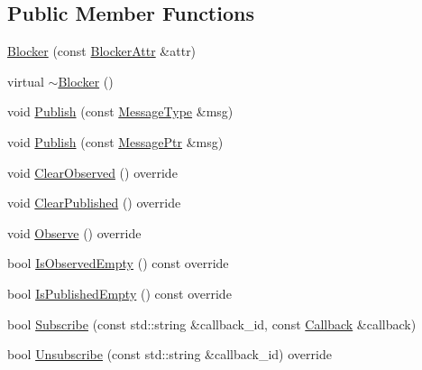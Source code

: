 \subsection*{Public Member Functions}
\begin{DoxyCompactItemize}
\item 
\hyperlink{classapollo_1_1cyber_1_1blocker_1_1Blocker_a088532493a0783825880ed2dbf97f783}{Blocker} (const \hyperlink{structapollo_1_1cyber_1_1blocker_1_1BlockerAttr}{Blocker\-Attr} \&attr)
\item 
virtual \hyperlink{classapollo_1_1cyber_1_1blocker_1_1Blocker_a843112b632a8700b492e91161e3792ea}{$\sim$\-Blocker} ()
\item 
void \hyperlink{classapollo_1_1cyber_1_1blocker_1_1Blocker_a6c07deb7c68f3007f484048cac1ae532}{Publish} (const \hyperlink{classapollo_1_1cyber_1_1blocker_1_1Blocker_ab6f5eb86a03109c66581e377a896650a}{Message\-Type} \&msg)
\item 
void \hyperlink{classapollo_1_1cyber_1_1blocker_1_1Blocker_a511886deab8a981a9f054d3f3622825a}{Publish} (const \hyperlink{classapollo_1_1cyber_1_1blocker_1_1Blocker_acfdb26545f6e05820e043a22ed91ed1d}{Message\-Ptr} \&msg)
\item 
void \hyperlink{classapollo_1_1cyber_1_1blocker_1_1Blocker_a2c1d83849cd31a60e0cd77fa20c0fb28}{Clear\-Observed} () override
\item 
void \hyperlink{classapollo_1_1cyber_1_1blocker_1_1Blocker_a541bf01ca37ca188743d43f0130f8ea7}{Clear\-Published} () override
\item 
void \hyperlink{classapollo_1_1cyber_1_1blocker_1_1Blocker_aa2daeae7b6757bbe6a8066ed045dc891}{Observe} () override
\item 
bool \hyperlink{classapollo_1_1cyber_1_1blocker_1_1Blocker_a629bb4a79c48af5998c52036b27dbc7a}{Is\-Observed\-Empty} () const override
\item 
bool \hyperlink{classapollo_1_1cyber_1_1blocker_1_1Blocker_ac6d16f3829849b236509dde3bbae3b29}{Is\-Published\-Empty} () const override
\item 
bool \hyperlink{classapollo_1_1cyber_1_1blocker_1_1Blocker_a76e6a44944c9fc6608ebb4b609fc8504}{Subscribe} (const std\-::string \&callback\-\_\-id, const \hyperlink{classapollo_1_1cyber_1_1blocker_1_1Blocker_aadf3f89fd884e1d9d2464172ede9213f}{Callback} \&callback)
\item 
bool \hyperlink{classapollo_1_1cyber_1_1blocker_1_1Blocker_a4223c5b06e38b685fcab97605822fdc1}{Unsubscribe} (const std\-::string \&callback\-\_\-id) override
\item 

\end{DoxyCompactItemize}
